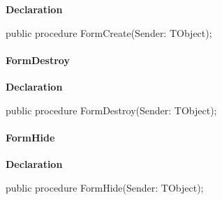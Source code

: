 \documentclass{report}
\newif\ifpdf
\begin{document}
\label{mnupdate.TForm1-FormCreate}
\begin{list}{}{
\setlength{\itemindent}{0cm}
\setlength{\listparindent}{0cm}
\setlength{\leftmargin}{\evensidemargin}
\addtolength{\leftmargin}{\tmplength}
\settowidth{\labelsep}{X}
\addtolength{\leftmargin}{\labelsep}
\setlength{\labelwidth}{\tmplength}
}
\item[\textbf{Declaration}\hfill]
\ifpdf
\begin{flushleft}
\fi
\begin{ttfamily}
public procedure FormCreate(Sender: TObject);\end{ttfamily}

\ifpdf
\end{flushleft}
\fi

\end{list}
\paragraph*{FormDestroy}\hspace*{\fill}

\label{mnupdate.TForm1-FormDestroy}
\begin{list}{}{
\setlength{\itemindent}{0cm}
\setlength{\listparindent}{0cm}
\setlength{\leftmargin}{\evensidemargin}
\addtolength{\leftmargin}{\tmplength}
\settowidth{\labelsep}{X}
\addtolength{\leftmargin}{\labelsep}
\setlength{\labelwidth}{\tmplength}
}
\item[\textbf{Declaration}\hfill]
\ifpdf
\begin{flushleft}
\fi
\begin{ttfamily}
public procedure FormDestroy(Sender: TObject);\end{ttfamily}

\ifpdf
\end{flushleft}
\fi

\end{list}
\paragraph*{FormHide}\hspace*{\fill}

\label{mnupdate.TForm1-FormHide}
\begin{list}{}{
\setlength{\itemindent}{0cm}
\setlength{\listparindent}{0cm}
\setlength{\leftmargin}{\evensidemargin}
\addtolength{\leftmargin}{\tmplength}
\settowidth{\labelsep}{X}
\addtolength{\leftmargin}{\labelsep}
\setlength{\labelwidth}{\tmplength}
}
\item[\textbf{Declaration}\hfill]
\ifpdf
\begin{flushleft}
\fi
\begin{ttfamily}
public procedure FormHide(Sender: TObject);\end{ttfamily}

\ifpdf
\end{flushleft}
\fi

\end{list}
\end{document}
